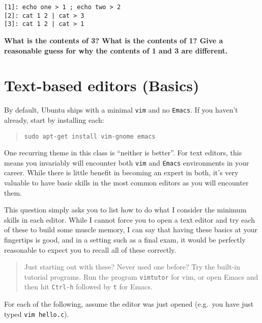 \documentclass{article}
\begin{document}
\begin{lstlisting}
[1]: echo one > 1 ; echo two > 2
[2]: cat 1 2 | cat > 3
[3]: cat 1 2 | cat > 1
\end{lstlisting}

\noindent
\textbf{What is the contents of 3? What is the contents of 1? Give a
reasonable guess for why the contents of 1 and 3 are different.}



\newpage


\section{Text-based editors (Basics)}

By default, Ubuntu ships with a minimal \texttt{vim} and no \texttt{Emacs}. If
you haven't already, start by installing each:
\begin{quote}
  \texttt{sudo apt-get install vim-gnome emacs}
\end{quote}
%
One recurring theme in this class is ``neither is better''.
For text editors, this means you invariably will encounter both \texttt{vim}
and \texttt{Emacs} environments in your career. While there is little benefit
in becoming an expert in both, it's very valuable to have basic skills in
the most common editors as you will encounter them.

This question simply asks you to list how to do what I consider the minimum
skills in each editor. While I cannot force you to open a text editor and try
each of these to build some muscle memory, I can say that having these basics
at your fingertips is good, and in a setting such as a final exam, it would be
perfectly reasonable to expect you to recall all of these correctly.

\begin{quote}
Just starting out with these? Never used one before? Try the built-in tutorial
programs. Run the program \texttt{vimtutor} for vim, or open Emacs and then
hit \texttt{Ctrl-h} followed by \texttt{t} for Emacs.
\end{quote}
%
For each of the following, assume the editor was just opened (e.g.\ you have
just typed \texttt{vim hello.c}).
\end{document}
